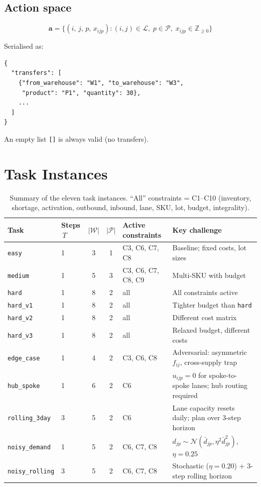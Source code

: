 \documentclass[11pt, a4paper]{article}
\begin{document}
\subsection{Action space}

\begin{equation}
  \mathbf{a} = \bigl\{(i,\, j,\, p,\, x_{ijp}) :
    (i,j) \in \mathcal{L},\; p \in \mathcal{P},\;
    x_{ijp} \in \mathbb{Z}_{\geq 0}\bigr\}
\end{equation}

Serialised as:
\begin{verbatim}
{
  "transfers": [
    {"from_warehouse": "W1", "to_warehouse": "W3",
     "product": "P1", "quantity": 30},
    ...
  ]
}
\end{verbatim}

An empty list \texttt{[]} is always valid (no transfers).

\section{Task Instances}

\begin{table}[h!]
\centering
\renewcommand{\arraystretch}{1.35}
\begin{tabular}{@{}llcclp{5.5cm}@{}}
\toprule
\textbf{Task} & \textbf{Steps}$\,T$ & $|\mathcal{W}|$ & $|\mathcal{P}|$
  & \textbf{Active constraints} & \textbf{Key challenge} \\
\midrule
\texttt{easy}        & 1 & 3 & 1 & C3, C6, C7, C8 &
  Baseline; fixed costs, lot sizes \\
\texttt{medium}      & 1 & 5 & 3 & C3, C6, C7, C8, C9 &
  Multi-SKU with budget \\
\texttt{hard}        & 1 & 8 & 2 & all &
  All constraints active \\
\texttt{hard\_v1}    & 1 & 8 & 2 & all &
  Tighter budget than \texttt{hard} \\
\texttt{hard\_v2}    & 1 & 8 & 2 & all &
  Different cost matrix \\
\texttt{hard\_v3}    & 1 & 8 & 2 & all &
  Relaxed budget, different costs \\
\texttt{edge\_case}  & 1 & 4 & 2 & C3, C6, C8 &
  Adversarial: asymmetric $f_{ij}$, cross-supply trap \\
\texttt{hub\_spoke}  & 1 & 6 & 2 & C6 &
  $u_{ijp}=0$ for spoke-to-spoke lanes; hub routing required \\
\texttt{rolling\_3day} & 3 & 5 & 2 & C6 &
  Lane capacity resets daily; plan over 3-step horizon \\
\texttt{noisy\_demand} & 1 & 5 & 2 & C6, C7, C8 &
  $d_{jp} \sim \mathcal{N}(\bar{d}_{jp}, \eta^2 \bar{d}_{jp}^2)$,\;
  $\eta=0.25$ \\
\texttt{noisy\_rolling} & 3 & 5 & 2 & C6, C7, C8 &
  Stochastic ($\eta=0.20$) + 3-step rolling horizon \\
\bottomrule
\end{tabular}
\caption{%
  Summary of the eleven task instances.
  ``All'' constraints = C1--C10 (inventory, shortage, activation,
  outbound, inbound, lane, SKU, lot, budget, integrality).
}
\end{table}
\end{document}
